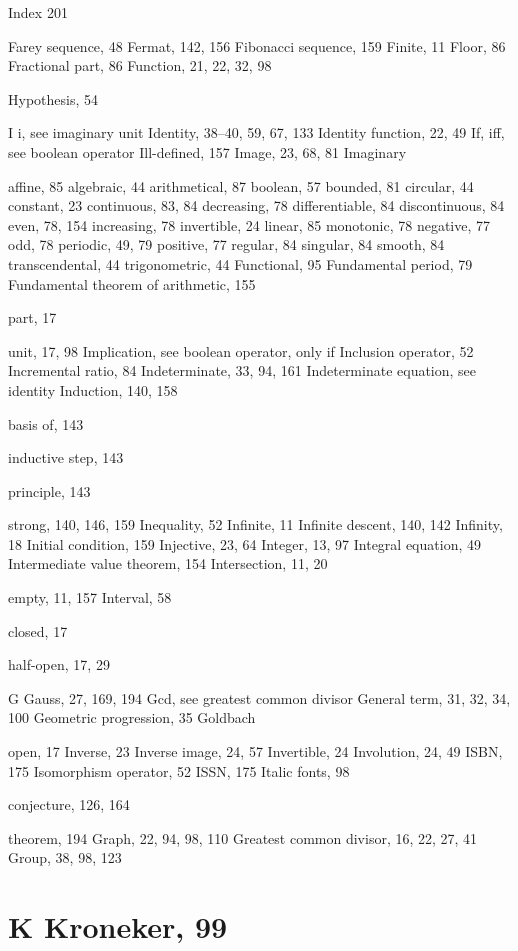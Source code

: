 \documentclass[11pt]{article}
\theoremstyle{plain}
\theoremstyle{definition}
\begin{document}
Index 201

Farey sequence, 48 Fermat, 142, 156 Fibonacci sequence, 159 Finite, 11 Floor, 86 Fractional part, 86 Function, 21, 22, 32, 98

Hypothesis, 54

I i, see imaginary unit Identity, 38--40, 59, 67, 133 Identity function, 22, 49 If, iff, see boolean operator Ill-defined, 157 Image, 23, 68, 81 Imaginary

affine, 85 algebraic, 44 arithmetical, 87 boolean, 57 bounded, 81 circular, 44 constant, 23 continuous, 83, 84 decreasing, 78 differentiable, 84 discontinuous, 84 even, 78, 154 increasing, 78 invertible, 24 linear, 85 monotonic, 78 negative, 77 odd, 78 periodic, 49, 79 positive, 77 regular, 84 singular, 84 smooth, 84 transcendental, 44 trigonometric, 44 Functional, 95 Fundamental period, 79 Fundamental theorem of arithmetic, 155

part, 17

unit, 17, 98 Implication, see boolean operator, only if Inclusion operator, 52 Incremental ratio, 84 Indeterminate, 33, 94, 161 Indeterminate equation, see identity Induction, 140, 158

basis of, 143

inductive step, 143

principle, 143

strong, 140, 146, 159 Inequality, 52 Infinite, 11 Infinite descent, 140, 142 Infinity, 18 Initial condition, 159 Injective, 23, 64 Integer, 13, 97 Integral equation, 49 Intermediate value theorem, 154 Intersection, 11, 20

empty, 11, 157 Interval, 58

closed, 17

half-open, 17, 29

G Gauss, 27, 169, 194 Gcd, see greatest common divisor General term, 31, 32, 34, 100 Geometric progression, 35 Goldbach

open, 17 Inverse, 23 Inverse image, 24, 57 Invertible, 24 Involution, 24, 49 ISBN, 175 Isomorphism operator, 52 ISSN, 175 Italic fonts, 98

conjecture, 126, 164

theorem, 194 Graph, 22, 94, 98, 110 Greatest common divisor, 16, 22, 27, 41 Group, 38, 98, 123

\section{K Kroneker, 99}
\end{document}
